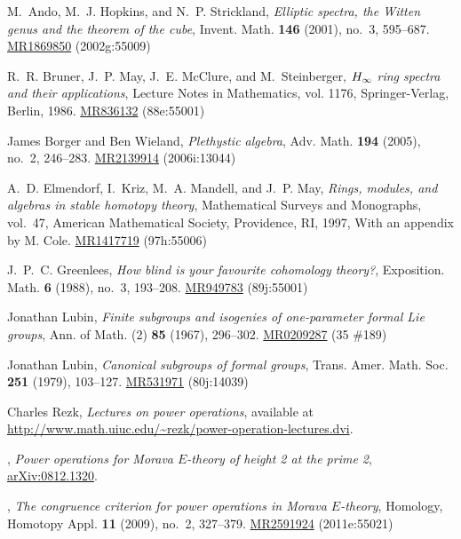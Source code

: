 \documentclass{gtpart}
\theoremstyle{definition}
\theoremstyle{remark}
\begin{document}
%
%

\newcommand{\MRn}[2]{\href{http://www.ams.org/mathscinet-getitem?mr=#1}{MR#1} #2}
\begin{thebibliography}

M.~Ando, M.~J. Hopkins, and N.~P. Strickland, \emph{Elliptic spectra, the
  {W}itten genus and the theorem of the cube}, Invent. Math. \textbf{146}
  (2001), no.~3, 595--687. \MRn{1869850}{(2002g:55009)}

R.~R. Bruner, J.~P. May, J.~E. McClure, and M.~Steinberger, \emph{{$H\sb \infty
  $} ring spectra and their applications}, Lecture Notes in Mathematics, vol.
  1176, Springer-Verlag, Berlin, 1986. \MRn{836132}{(88e:55001)}

James Borger and Ben Wieland, \emph{Plethystic algebra}, Adv. Math.
  \textbf{194} (2005), no.~2, 246--283. \MRn{2139914}{(2006i:13044)}

A.~D. Elmendorf, I.~Kriz, M.~A. Mandell, and J.~P. May, \emph{Rings, modules,
  and algebras in stable homotopy theory}, Mathematical Surveys and Monographs,
  vol.~47, American Mathematical Society, Providence, RI, 1997, With an
  appendix by M. Cole. \MRn{1417719}{(97h:55006)}

J.~P.~C. Greenlees, \emph{How blind is your favourite cohomology theory?},
  Exposition. Math. \textbf{6} (1988), no.~3, 193--208. \MRn{949783}{(89j:55001)}

Jonathan Lubin, \emph{Finite subgroups and isogenies of one-parameter formal
  {L}ie groups}, Ann. of Math. (2) \textbf{85} (1967), 296--302. \MRn{0209287}{(35 \#189)}

Jonathan Lubin, \emph{Canonical subgroups of formal groups}, Trans. Amer. Math.
  Soc. \textbf{251} (1979), 103--127. \MRn{531971}{(80j:14039)}

Charles Rezk, \emph{Lectures on power operations}, available at
  \url{http://www.math.uiuc.edu/~rezk/power-operation-lectures.dvi}.

\bysame, \emph{Power operations for {M}orava ${E}$-theory of height 2 at the
  prime 2}, \href{http://arxiv.org/abs/0812.1320}{arXiv:0812.1320}.

\bysame, \emph{The congruence criterion for power operations in {M}orava
  {$E$}-theory}, Homology, Homotopy Appl. \textbf{11} (2009), no.~2, 327--379.
  \MRn{2591924}{(2011e:55021)}


\end{thebibliography}
\end{document}
